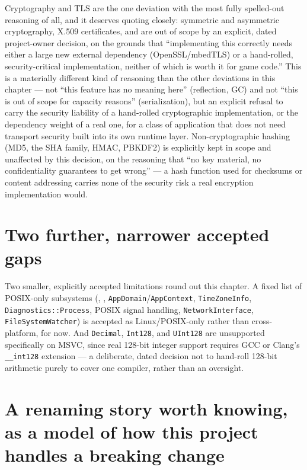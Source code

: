 Cryptography and TLS are the one deviation with the most fully spelled-out reasoning of all,
and it deserves quoting closely: symmetric and asymmetric cryptography, X.509 certificates,
and  are out of scope by an explicit, dated project-owner decision, on the
grounds that ``implementing this correctly needs either a large new external dependency
(OpenSSL/mbedTLS) or a hand-rolled, security-critical implementation, neither of which is
worth it for game code.'' This is a materially different kind of reasoning than the other
deviations in this chapter --- not ``this feature has no meaning here'' (reflection, GC) and
not ``this is out of scope for capacity reasons'' (serialization), but an explicit refusal to
carry the security liability of a hand-rolled cryptographic implementation, or the dependency
weight of a real one, for a class of application that does not need transport security built
into its own runtime layer. Non-cryptographic hashing (MD5, the SHA family, HMAC, PBKDF2) is
explicitly kept in scope and unaffected by this decision, on the reasoning that ``no key
material, no confidentiality guarantees to get wrong'' --- a hash function used for checksums
or content addressing carries none of the security risk a real encryption implementation
would.

\section{Two further, narrower accepted gaps}

Two smaller, explicitly accepted limitations round out this chapter. A fixed list of
POSIX-only subsystems (, ,
\texttt{AppDomain}/\texttt{AppContext}, \texttt{TimeZoneInfo}, \texttt{Diagnostics::Process},
POSIX signal handling, \texttt{NetworkInterface}, \texttt{FileSystemWatcher}) is accepted as
Linux/POSIX-only rather than cross-platform, for now. And \texttt{Decimal}, \texttt{Int128},
and \texttt{UInt128} are unsupported specifically on MSVC, since real 128-bit integer support
requires GCC or Clang's \texttt{\_\_int128} extension --- a deliberate, dated decision not to
hand-roll 128-bit arithmetic purely to cover one compiler, rather than an oversight.

\section{A renaming story worth knowing, as a model of how this project handles a breaking change}

